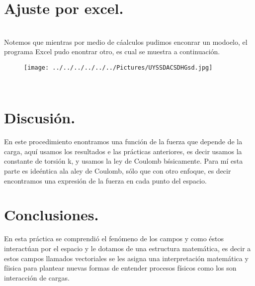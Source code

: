 \documentclass[11pt,a4paper]{article}
\begin{document}
{\section*{Ajuste por excel.}\\
Notemos que mientras por medio de c\'{a}alculos pudimos enconrar un modoelo, el programa Excel pudo enontrar otro, es cual se muestra a continuaci\'{o}n.
\\
\begin{figure}[hbtp]
 \centering
\texttt{[image: ../../../../../../Pictures/UYSSDACSDHGsd.jpg]} 
\end{figure}
\\


\section{Discusi\'{o}n.}
En este procedimiento enontramos una funci\'{o}n de la fuerza que depende de la carga, aqu\'{i} usamos los resultados e las pr\'{a}cticas anteriores, es decir usamos la constante de torsi\'{o}n k, y usamos la ley de Coulomb b\'{s}sicamente. Para m\'{i} esta parte es ide\'{e}ntica ala aley de Coulomb, s\'{o}lo que con otro enfoque, es decir encontramos una expresi\'{o}n de la fuerza en cada punto del espacio. 


\section{Conclusiones.}
En esta pr\'{a}ctica se comprendi\'{o} el fen\'{o}meno de los campos y como \'{e}stos interact\'{u}an por el espacio y le dotamos de una estructura matem\'{a}tica, es decir a estos campos llamados vectoriales se les asigna una interpretaci\'{o}n matem\'{a}tica y f\'{i}isica para plantear nuevas formas de entender procesos f\'{i}sicos como los son interacci\'{o}n de cargas. 
}
\end{document}
